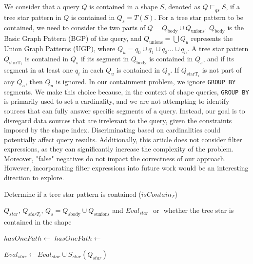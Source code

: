 We consider that a query $Q$ is contained in a shape $S$, denoted as $Q \sqsubseteq_{qs} S$, if a tree star pattern in $Q$ is contained in $Q_s = T(S)$. 
For a tree star pattern to be contained, we need to consider the two parts of $Q = Q_{\text{body}} \cup Q_{\text{unions}}$.
$Q_{\text{body}}$ is the Basic Graph Pattern (BGP) of the query, and $Q_{\text{unions}} = \bigcup Q_u$ represents the Union Graph Patterns (UGP), where $Q_u = q_0 \cup q_1 \cup q_2 \dots \cup q_n$.
A tree star pattern $Q_{\text{starT}_i}$ is contained in $Q_s$ if its segment in $Q_{\text{body}}$ is contained in $Q_s$, and if its segment in at least one $q_i$ in each $Q_u$ is contained in $Q_s$. 
If $Q_{\text{starT}_i}$ is not part of any $Q_u$, then $Q_u$ is ignored.
In our containment problem, we ignore \texttt{GROUP BY} segments. 
We make this choice because, in the context of shape queries, \texttt{GROUP BY} is primarily used to set a cardinality, and we are not attempting to identify sources that can fully answer specific segments of a query. 
Instead, our goal is to disregard data sources that are irrelevant to the query, given the constraints imposed by the shape index. 
Discriminating based on cardinalities could potentially affect query results.
Additionally, this article does not consider filter expressions, as they can significantly increase the complexity of the problem.
Moreover, "false" negatives do not impact the correctness of our approach. 
However, incorporating filter expressions into future work would be an interesting direction to explore.

\begin{algorithm}[h]
   \caption{Determine if a tree star pattern is contained ($isContain_{T}$)}\label{alg:containmentTree}
   \begin{algorithmic}
      \REQUIRE  $Q_{star}$, $Q_{starT_i}$, $Q_s = Q_{s\text{body}} \cup Q_{s\text{unions}}$ and $Eval_{star}$
      \ENSURE \TRUE $ $ or \FALSE $ $ whether the tree star is contained in the shape

         \RETURN \TRUE
      \ENDIF 

            \STATE $hasOnePath \gets $ \FALSE
                  \STATE $hasOnePath \gets $ \TRUE
               \ENDIF
            \ENDFOR
               \RETURN \FALSE
            \ENDIF
         \ELSE
                  \RETURN \FALSE
               \ENDIF
            \ENDIF
         \ENDIF
      \ENDFOR

      \STATE $Eval_{star} \gets Eval_{star} \cup S_{star}(Q_{star})$
      \RETURN \TRUE
   \end{algorithmic}
\end{algorithm}


